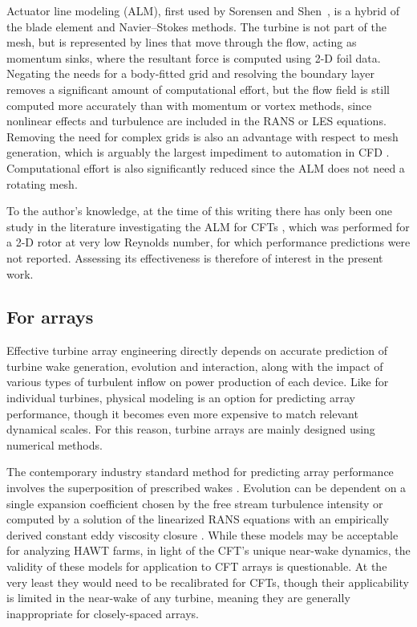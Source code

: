 
Actuator line modeling (ALM), first used by Sorensen and
Shen~\cite{Sorensen2002}, is a hybrid of the blade element and Navier--Stokes
methods. The turbine is not part of the mesh, but is represented by lines that
move through the flow, acting as momentum sinks, where the resultant force is
computed using 2-D foil data. Negating the needs for a body-fitted grid and
resolving the boundary layer removes a significant amount of computational
effort, but the flow field is still computed more accurately than with momentum
or vortex methods, since nonlinear effects and turbulence are included in the
RANS or LES equations. Removing the need for complex grids is also an advantage
with respect to  mesh generation, which is arguably the largest impediment to
automation in CFD \cite{Slotnick2014}. Computational effort is also
significantly reduced since the ALM does not need a rotating mesh.


To the author's knowledge, at the time of
this writing there has only been one study in the literature investigating the
ALM for CFTs \cite{Shamsoddin2014}, which was performed for a 2-D rotor at very
low Reynolds number, for which performance predictions were not reported.
Assessing its effectiveness is therefore of interest in the present work.


\subsection{For arrays}

Effective turbine array engineering directly depends on accurate prediction of
turbine wake generation, evolution and interaction, along with the impact of
various types of turbulent inflow on power production of each device. Like for
individual turbines, physical modeling is an option for predicting array
performance, though it becomes even more expensive to match relevant dynamical
scales. For this reason, turbine arrays are mainly designed using numerical
methods.

The contemporary industry standard method for predicting array performance
involves the superposition of prescribed wakes \cite{Stevens2014b}. Evolution
can be dependent on a single expansion coefficient chosen by the free stream
turbulence intensity \cite{Jensen1983, Choi2013} or computed by a solution of
the linearized RANS equations with an empirically derived constant eddy
viscosity closure \cite{Ainslie1988}. While these models may be acceptable for
analyzing HAWT farms, in light of the CFT's unique near-wake dynamics, the
validity of these models for application to CFT arrays is questionable. At the
very least they would need to be recalibrated for CFTs, though their
applicability is limited in the near-wake of any turbine, meaning they are
generally inappropriate for closely-spaced arrays.

